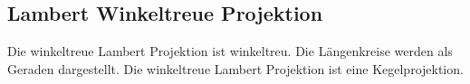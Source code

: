\subsection{Lambert Winkeltreue Projektion}
\label{sec:lamwink}
Die winkeltreue Lambert Projektion ist winkeltreu. Die Längenkreise werden als Geraden dargestellt.
Die winkeltreue Lambert Projektion ist eine Kegelprojektion. 